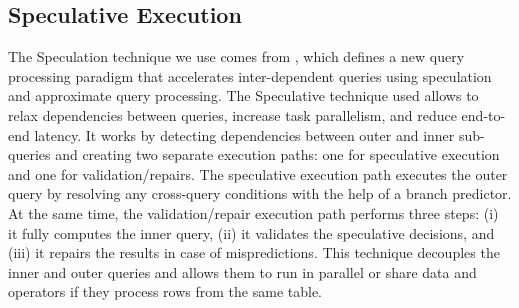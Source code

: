 \subsection{Speculative Execution}
\label{section:speculation}
The Speculation technique we use comes from \cite{Sioulas:282304}, which defines a new query processing paradigm that accelerates inter-dependent queries using speculation and approximate query processing. The Speculative technique used allows to relax dependencies between queries, increase task parallelism, and reduce end-to-end latency. It works by detecting dependencies between outer and inner sub-queries and creating two separate execution paths: one for speculative execution and one for validation/repairs. The speculative execution path executes the outer query by resolving any cross-query conditions with the help of a branch predictor. At the same time, the validation/repair execution path performs three steps: (i) it fully computes the inner query, (ii) it validates the speculative decisions, and (iii) it repairs the results in case of mispredictions. This technique decouples the inner and outer queries and allows them to run in parallel or share data and operators if they process rows from the same table.
